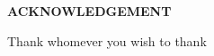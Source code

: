 
\begin{center}
  {\Large{\bf{ACKNOWLEDGEMENT}}}
\end{center}

\vspace{2em}
\begin{center}
   Thank whomever you wish to thank 
\end{center}

\vspace{2em}

\clearpage


